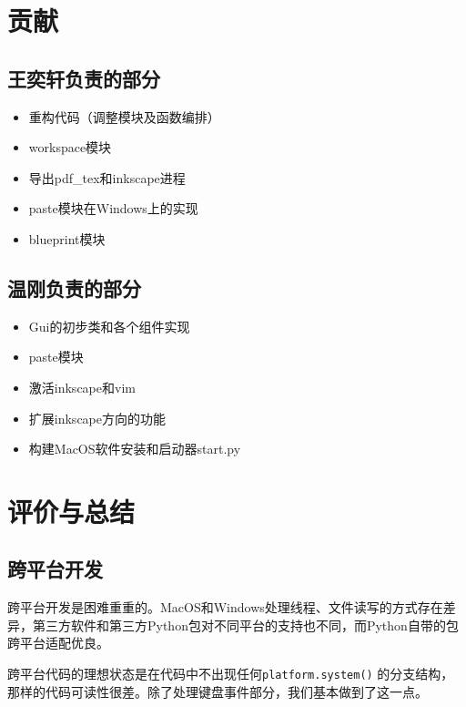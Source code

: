 \documentclass[AutoFakeBold,letterpaper,12pt,hidelinks]{article}
\begin{document}
\section{贡献}

\subsection{王奕轩负责的部分}
\begin{itemize}
    \item 重构代码（调整模块及函数编排）
    \item workspace模块
    \item 导出pdf\_tex和inkscape进程
    \item paste模块在Windows上的实现
    \item blueprint模块
\end{itemize}

\subsection{温刚负责的部分}%

\begin{itemize}
	\item Gui的初步类和各个组件实现

	\item  paste模块

	\item 激活inkscape和vim

	\item 扩展inkscape方向的功能

	\item 构建MacOS软件安装和启动器start.py 
\end{itemize}
\section{评价与总结}

\subsection{跨平台开发}

跨平台开发是困难重重的。MacOS和Windows处理线程、文件读写的方式存在差异，第三方软件和第三方Python包对不同平台的支持也不同，而Python自带的包跨平台适配优良。

跨平台代码的理想状态是在代码中不出现任何\texttt{platform.system()} 的分支结构，那样的代码可读性很差。除了处理键盘事件部分，我们基本做到了这一点。
\end{document}
